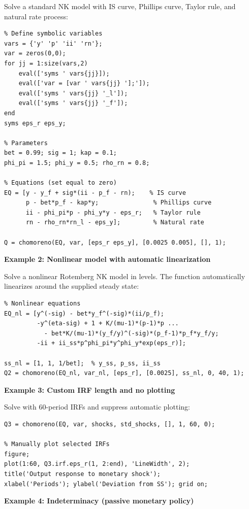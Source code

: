 \documentclass{article}
\begin{document}
\medskip
\noindent Solve a standard NK model with IS curve, Phillips curve, Taylor rule, and natural rate process:
\begin{verbatim}
% Define symbolic variables
vars = {'y' 'p' 'ii' 'rn'};
var = zeros(0,0);
for jj = 1:size(vars,2)
    eval(['syms ' vars{jj}]);
    eval(['var = [var ' vars{jj} '];']);
    eval(['syms ' vars{jj} '_l']);
    eval(['syms ' vars{jj} '_f']);
end
syms eps_r eps_y;

% Parameters
bet = 0.99; sig = 1; kap = 0.1;
phi_pi = 1.5; phi_y = 0.5; rho_rn = 0.8;

% Equations (set equal to zero)
EQ = [y - y_f + sig*(ii - p_f - rn);    % IS curve
      p - bet*p_f - kap*y;               % Phillips curve
      ii - phi_pi*p - phi_y*y - eps_r;   % Taylor rule
      rn - rho_rn*rn_l - eps_y];         % Natural rate

Q = chomoreno(EQ, var, [eps_r eps_y], [0.0025 0.005], [], 1);
\end{verbatim}

\vspace{1em}
\noindent\textbf{Example 2: Nonlinear model with automatic linearization}

\medskip
\noindent Solve a nonlinear Rotemberg NK model in levels. The function automatically linearizes around the supplied steady state:
\begin{verbatim}
% Nonlinear equations
EQ_nl = [y^(-sig) - bet*y_f^(-sig)*(ii/p_f);
         -y^(eta-sig) + 1 + K/(mu-1)*(p-1)*p ...
           - bet*K/(mu-1)*(y_f/y)^(-sig)*(p_f-1)*p_f*y_f/y;
         -ii + ii_ss*p^phi_pi*y^phi_y*exp(eps_r)];

ss_nl = [1, 1, 1/bet];  % y_ss, p_ss, ii_ss
Q2 = chomoreno(EQ_nl, var_nl, [eps_r], [0.0025], ss_nl, 0, 40, 1);
\end{verbatim}

\vspace{1em}
\noindent\textbf{Example 3: Custom IRF length and no plotting}

\medskip
\noindent Solve with 60-period IRFs and suppress automatic plotting:
\begin{verbatim}
Q3 = chomoreno(EQ, var, shocks, std_shocks, [], 1, 60, 0);

% Manually plot selected IRFs
figure;
plot(1:60, Q3.irf.eps_r(1, 2:end), 'LineWidth', 2);
title('Output response to monetary shock');
xlabel('Periods'); ylabel('Deviation from SS'); grid on;
\end{verbatim}

\vspace{1em}
\noindent\textbf{Example 4: Indeterminacy (passive monetary policy)}
\end{document}
